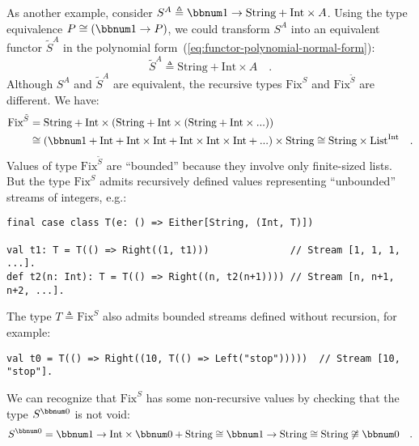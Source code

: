 As another example, consider $S^{A}\triangleq\bbnum 1\rightarrow\text{String}+\text{Int}\times A$.
Using the type equivalence $P\cong(\bbnum 1\rightarrow P)$, we could
transform $S^{A}$ into an equivalent functor $\tilde{S}^{A}$ in
the polynomial form~(\ref{eq:functor-polynomial-normal-form}):
\[
\tilde{S}^{A}\triangleq\text{String}+\text{Int}\times A\quad.
\]
Although $S^{A}$ and $\tilde{S}^{A}$ are equivalent, the recursive
types $\text{Fix}^{S}$ and $\text{Fix}^{\tilde{S}}$ are different.
We have:
\begin{align*}
\text{Fix}^{\tilde{S}} & =\text{String}+\text{Int}\times(\text{String}+\text{Int}\times(\text{String}+\text{Int}\times...))\\
 & \cong\left(\bbnum 1+\text{Int}+\text{Int}\times\text{Int}+\text{Int}\times\text{Int}\times\text{Int}+...\right)\times\text{String}\cong\text{String}\times\text{List}^{\text{Int}}\quad.
\end{align*}
Values of type $\text{Fix}^{\tilde{S}}$ are \textsf{``}bounded\textsf{''} because
they involve only finite-sized lists. But the type $\text{Fix}^{S}$
admits recursively defined values representing \textsf{``}unbounded\textsf{''} streams
of integers, e.g.:
\begin{lstlisting}[mathescape=true]
final case class T(e: () => Either[String, (Int, T)])

val t1: T = T(() => Right((1, t1)))              // Stream [1, 1, 1, ...].
def t2(n: Int): T = T(() => Right((n, t2(n+1)))) // Stream [n, n+1, n+2, ...].
\end{lstlisting}
The type $T\triangleq\text{Fix}^{S}$ also admits bounded streams
defined without recursion, for example:
\begin{lstlisting}
val t0 = T(() => Right((10, T(() => Left("stop")))))  // Stream [10, "stop"].
\end{lstlisting}
We can recognize that $\text{Fix}^{S}$ has some non-recursive values
by checking that the type $S^{\bbnum 0}$ is not void:
\[
S^{\bbnum 0}=\bbnum 1\rightarrow\text{Int}\times\bbnum 0+\text{String}\cong\bbnum 1\rightarrow\text{String}\cong\text{String}\not\cong\bbnum 0\quad.
\]

